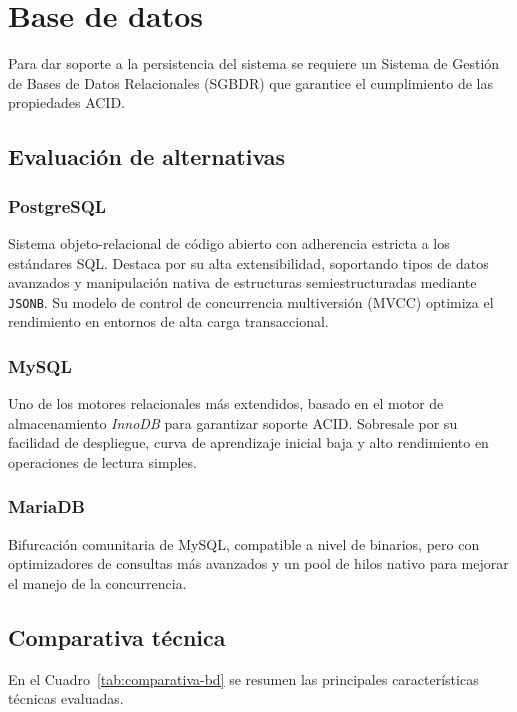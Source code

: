 \section{Base de datos}

Para dar soporte a la persistencia del sistema se requiere un Sistema de Gestión de Bases de Datos Relacionales (SGBDR) que garantice el cumplimiento de las propiedades \ac{ACID}.

\subsection*{Evaluación de alternativas}

\subsubsection*{PostgreSQL}
Sistema objeto-relacional de código abierto con adherencia estricta a los estándares SQL. Destaca por su alta extensibilidad, soportando tipos de datos avanzados y manipulación nativa de estructuras semiestructuradas mediante \texttt{JSONB}. Su modelo de control de concurrencia multiversión (MVCC) optimiza el rendimiento en entornos de alta carga transaccional.

\subsubsection*{MySQL}
Uno de los motores relacionales más extendidos, basado en el motor de almacenamiento \emph{InnoDB} para garantizar soporte ACID. Sobresale por su facilidad de despliegue, curva de aprendizaje inicial baja y alto rendimiento en operaciones de lectura simples.

\subsubsection*{MariaDB}
Bifurcación comunitaria de MySQL, compatible a nivel de binarios, pero con optimizadores de consultas más avanzados y un pool de hilos nativo para mejorar el manejo de la concurrencia.

\subsection*{Comparativa técnica}

En el Cuadro~\ref{tab:comparativa-bd} se resumen las principales características técnicas evaluadas.

